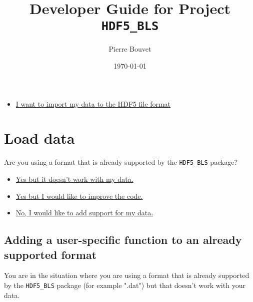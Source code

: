 \documentclass[a4paper,12pt]{article}
\title{Developer Guide for Project \texttt{HDF5\_BLS}}
\author{Pierre Bouvet}
\date{\today}
\begin{document}
\maketitle


\begin{tcolorbox}[title=Why are you here?]
    \begin{itemize}
        \item \hyperref[sec:load_data]{I want to import my data to the HDF5 file format}
    \end{itemize}
\end{tcolorbox}

\section{Load data} \label{sec:load_data}

    \begin{tcolorbox}
        Are you using a format that is already supported by the \texttt{HDF5\_BLS} package?
        \begin{itemize}
            \item \hyperref[subsec:load_data.user_specific]{Yes but it doesn't work with my data.}
            \item \hyperref[subsec:load_data.improvement]{Yes but I would like to improve the code.}
            \item \hyperref[subsec:load_data.new_format]{No, I would like to add support for my data.}
        \end{itemize}
    \end{tcolorbox}

    \subsection{Adding a user-specific function to an already supported format} \label{subsec:load_data.user_specific}

        \begin{tcolorbox}
            You are in the situation where you are using a format that is already supported by the \texttt{HDF5\_BLS} package (for example ".dat") but that doesn't work with your data.
        \end{tcolorbox}
\end{document}
